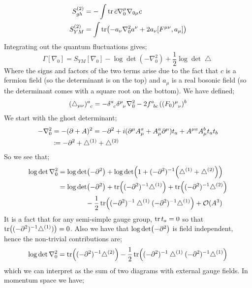 \begin{align*}
S_{gh}^{(2)} &= -\int{\tr \bar{c}\nabla_0^\mu \nabla_{0\mu}c} \\
S_{YM}^{(2)} &= \int{\tr \left(-a_\nu \nabla_0^2 a^\nu + 2a_\nu[F^{\mu\nu}, a_\mu]\right)}
\end{align*}
Integrating out the quantum fluctuations gives;
\begin{equation}
\Gamma[\nabla_0] = S_{YM}[\nabla_0] - \log \det (-\nabla_0^2) + \frac{1}{2}\log \det \bigtriangleup
\end{equation}
Where the signs and factors of the two terms arise due to the fact that $c$ is a fermion field (so the determinant is on the top) and $a_\mu$ is a real bosonic field (so the determinant comes with a square root on the bottom). We have defined;
\begin{equation*}
(\bigtriangleup_{\mu\nu})\indices{^{a}_{c}} = -\delta\indices{^{a}_{c}}\delta\indices{^{\mu}_{\nu}} \nabla_0^2 - 2f\indices{^{a}_{bc}}((F_0)\indices{^{\mu}_{\nu}})^{b}
\end{equation*}
We start with the ghost determinant;
\begin{align*}
-\nabla_0^2 &= -(\partial + A)^2 = -\partial^2 + i(\partial^\mu A_\mu^a + A_\mu^a \partial^\mu)t_a + A^{\mu a}A^b_\mu t_a t_b \\
&\coloneqq -\partial^2 + \bigtriangleup^{(1)} + \bigtriangleup^{(2)}
\end{align*}
So we see that;
\begin{align*}
\log \det \nabla_0^2 &= \log \det(-\del^2) + \log \det \left(1 + (-\del^2)^{-1}\left(\bigtriangleup^{(1)} + \bigtriangleup^{(2)}\right)\right) \\
&= \log \det (-\del^2) + \tr\left((-\del^2)^{-1}\bigtriangleup^{(1)}\right) + \tr\left((-\del^2)^{-1}\bigtriangleup^{(2)}\right) \\
&\qquad \qquad- \frac{1}{2}\tr\left((-\del^2)^{-1}\bigtriangleup^{(1)}(-\del^2)^{-1}\bigtriangleup^{(1)}\right) + \mO(A^3)
\end{align*}
It is a fact that for any semi-simple gauge group, $\tr t_a = 0$ so that $\tr\left((-\del^2)^{-1}\bigtriangleup^{(1)})\right) = 0$. Also we have that $\log \det(-\partial^2)$ is field independent, hence the non-trivial contributions are;
\begin{equation*}
\log \det \nabla_0^2 = \tr\left((-\del^2)^{-1}\bigtriangleup^{(2)}\right) - \frac{1}{2}\tr\left((-\del^2)^{-1}\bigtriangleup^{(1)}(-\del^2)^{-1}\bigtriangleup^{(1)}\right)
\end{equation*}
which we can interpret as the sum of two diagrams with external gauge fields. In momentum space we have;
